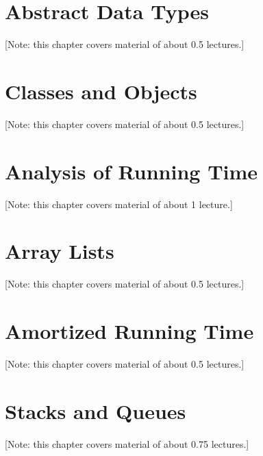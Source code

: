 \documentclass{book}
\begin{document}
%
% 

\chapter{Abstract Data Types}
\label{chap:ADTs}
[Note: this chapter covers material of about 0.5 lectures.]

%

\chapter{Classes and Objects}
\label{chap:classes}
[Note: this chapter covers material of about 0.5 lectures.]

%

\chapter{Analysis of Running Time}
\label{chap:running-time}
[Note: this chapter covers material of about 1 lecture.]

%

\chapter{Array Lists}
\label{chap:arraylists}
[Note: this chapter covers material of about 0.5 lectures.]

%

\chapter{Amortized Running Time}
\label{chap:amortized}
[Note: this chapter covers material of about 0.5 lectures.]

%

\chapter{Stacks and Queues}
\label{chap:stacksqueues}
[Note: this chapter covers material of about 0.75 lectures.]
\end{document}
